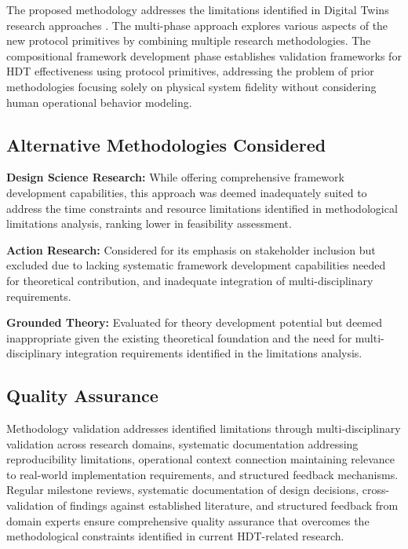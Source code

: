 \documentclass[12pt,a4paper]{article}
\begin{document}
The proposed methodology addresses the limitations identified in Digital Twins research approaches \cite{10.1186/s10033-024-00998-7} \cite{10.1016/j.ifacol.2022.09.675}. The multi-phase approach explores various aspects of the new protocol primitives by combining multiple research methodologies. The compositional framework development phase establishes validation frameworks for HDT effectiveness using protocol primitives, addressing the problem of prior methodologies focusing solely on physical system fidelity without considering human operational behavior modeling.

\subsection{Alternative Methodologies Considered}

\noindent \textbf{Design Science Research:} While offering comprehensive framework development capabilities, this approach was deemed inadequately suited to address the time constraints and resource limitations identified in methodological limitations analysis, ranking lower in feasibility assessment.

\noindent \textbf{Action Research:} Considered for its emphasis on stakeholder inclusion but excluded due to lacking systematic framework development capabilities needed for theoretical contribution, and inadequate integration of multi-disciplinary requirements.

\noindent \textbf{Grounded Theory:} Evaluated for theory development potential but deemed inappropriate given the existing theoretical foundation and the need for multi-disciplinary integration requirements identified in the limitations analysis.

\subsection{Quality Assurance}

Methodology validation addresses identified limitations through multi-disciplinary validation across research domains, systematic documentation addressing reproducibility limitations, operational context connection maintaining relevance to real-world implementation requirements, and structured feedback mechanisms. Regular milestone reviews, systematic documentation of design decisions, cross-validation of findings against established literature, and structured feedback from domain experts ensure comprehensive quality assurance that overcomes the methodological constraints identified in current HDT-related research.
\end{document}
